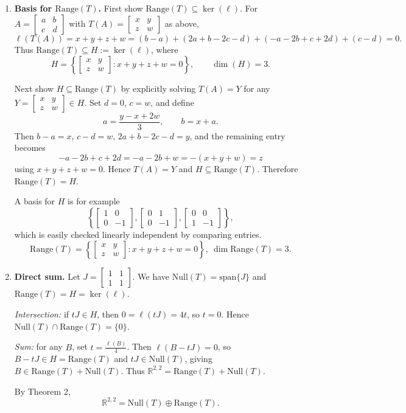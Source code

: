 \documentclass[12pt]{article}
\newcommand{\R}{\mathbb{R}}
\begin{document}
\begin{enumerate}[label=(\alph*)]
\item \textbf{Basis for $\mathrm{Range}(T)$.}
First show $\mathrm{Range}(T)\subseteq \ker(\ell)$. For $A=\begin{bmatrix}a&b\\c&d\end{bmatrix}$ with $T(A)=\begin{bmatrix}x&y\\z&w\end{bmatrix}$ as above,
\[
\ell(T(A))=x+y+z+w=(b-a)+(2a+b-2c-d)+(-a-2b+c+2d)+(c-d)=0.
\]
Thus $\mathrm{Range}(T)\subseteq H:=\ker(\ell)$, where
\[
H=\left\{\begin{bmatrix}x&y\\z&w\end{bmatrix}:x+y+z+w=0\right\},\qquad \dim(H)=3.
\]

Next show $H\subseteq \mathrm{Range}(T)$ by explicitly solving $T(A)=Y$ for any $Y=\begin{bmatrix}x&y\\z&w\end{bmatrix}\in H$.
Set $d=0$, $c=w$, and define
\[
a=\frac{y-x+2w}{3},\qquad b=x+a.
\]
Then $b-a=x$, $c-d=w$, $2a+b-2c-d=y$, and the remaining entry becomes
\[
-a-2b+c+2d=-a-2b+w=-(x+y+w)=z
\]
using $x+y+z+w=0$. Hence $T(A)=Y$ and $H\subseteq\mathrm{Range}(T)$.
Therefore $\mathrm{Range}(T)=H$.

A basis for $H$ is for example
\[
\left\{
\begin{bmatrix}1&0\\0&-1\end{bmatrix},
\begin{bmatrix}0&1\\0&-1\end{bmatrix},
\begin{bmatrix}0&0\\1&-1\end{bmatrix}
\right\},
\]
which is easily checked linearly independent by comparing entries.
\[
\boxed{\,\mathrm{Range}(T)=\left\{\begin{bmatrix}x&y\\z&w\end{bmatrix}:x+y+z+w=0\right\},\ \dim\mathrm{Range}(T)=3.\,}
\]

\item \textbf{Direct sum.}
Let $J=\begin{bmatrix}1&1\\1&1\end{bmatrix}$. We have $\mathrm{Null}(T)=\mathrm{span}\{J\}$ and $\mathrm{Range}(T)=H=\ker(\ell)$.

\emph{Intersection:} if $tJ\in H$, then $0=\ell(tJ)=4t$, so $t=0$. Hence $\mathrm{Null}(T)\cap \mathrm{Range}(T)=\{0\}$.

\emph{Sum:} for any $B$, set $t=\frac{\ell(B)}{4}$. Then $\ell(B-tJ)=0$, so $B-tJ\in H=\mathrm{Range}(T)$ and $tJ\in\mathrm{Null}(T)$, giving $B\in \mathrm{Range}(T)+\mathrm{Null}(T)$.
Thus $\R^{2,2}=\mathrm{Range}(T)+\mathrm{Null}(T)$.

By Theorem 2,
\[
\boxed{\,\R^{2,2}=\mathrm{Null}(T)\oplus \mathrm{Range}(T).\,}
\]
\end{enumerate}
\end{document}
